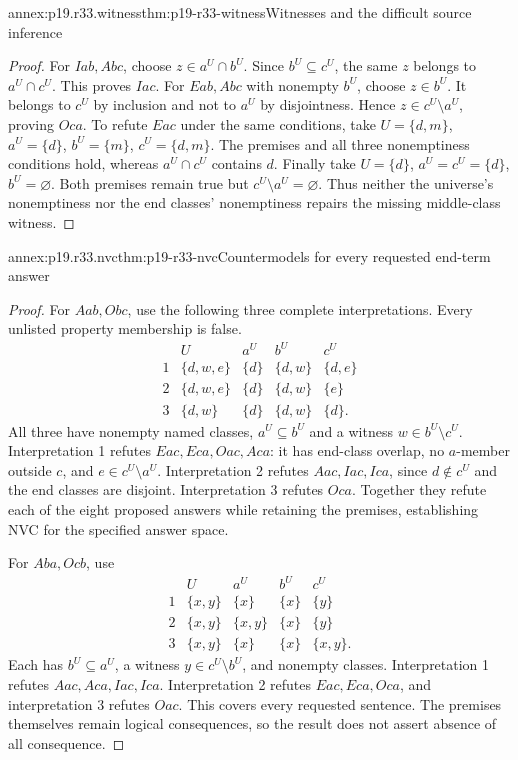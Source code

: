 \begin{annexitem}{annex:p19.r33.witness}{thm:p19-r33-witness}{Witnesses and the difficult source inference}
\begin{proof}
For \(Iab,Abc\), choose \(z\in a^U\cap b^U\).
Since \(b^U\subseteq c^U\), the same \(z\) belongs to
\(a^U\cap c^U\). This proves \(Iac\).
For \(Eab,Abc\) with nonempty \(b^U\), choose \(z\in b^U\).
It belongs to \(c^U\) by inclusion and not to \(a^U\) by
disjointness. Hence \(z\in c^U\setminus a^U\), proving \(Oca\).
To refute \(Eac\) under the same conditions, take
\(U=\{d,m\}\), \(a^U=\{d\}\), \(b^U=\{m\}\),
\(c^U=\{d,m\}\). The premises and all three nonemptiness
conditions hold, whereas \(a^U\cap c^U\) contains \(d\).
Finally take \(U=\{d\}\), \(a^U=c^U=\{d\}\),
\(b^U=\varnothing\). Both premises remain true but
\(c^U\setminus a^U=\varnothing\). Thus neither the universe's
nonemptiness nor the end classes' nonemptiness repairs the missing
middle-class witness.
\end{proof}
\end{annexitem}

\begin{annexitem}{annex:p19.r33.nvc}{thm:p19-r33-nvc}{Countermodels for every requested end-term answer}
\begin{proof}
For \(Aab,Obc\), use the following three complete interpretations.
Every unlisted property membership is false.
\[
\begin{array}{c|c|c|c|c}
&U&a^U&b^U&c^U\\
1&\{d,w,e\}&\{d\}&\{d,w\}&\{d,e\}\\
2&\{d,w,e\}&\{d\}&\{d,w\}&\{e\}\\
3&\{d,w\}&\{d\}&\{d,w\}&\{d\}.
\end{array}
\]
All three have nonempty named classes, \(a^U\subseteq b^U\)
and a witness \(w\in b^U\setminus c^U\).
Interpretation 1 refutes \(Eac,Eca,Oac,Aca\): it has end-class
overlap, no \(a\)-member outside \(c\), and \(e\in c^U\setminus a^U\).
Interpretation 2 refutes \(Aac,Iac,Ica\), since \(d\notin c^U\)
and the end classes are disjoint. Interpretation 3 refutes \(Oca\).
Together they refute each of the eight proposed answers while retaining
the premises, establishing NVC for the specified answer space.

For \(Aba,Ocb\), use
\[
\begin{array}{c|c|c|c|c}
&U&a^U&b^U&c^U\\
1&\{x,y\}&\{x\}&\{x\}&\{y\}\\
2&\{x,y\}&\{x,y\}&\{x\}&\{y\}\\
3&\{x,y\}&\{x\}&\{x\}&\{x,y\}.
\end{array}
\]
Each has \(b^U\subseteq a^U\), a witness
\(y\in c^U\setminus b^U\), and nonempty classes.
Interpretation 1 refutes \(Aac,Aca,Iac,Ica\).
Interpretation 2 refutes \(Eac,Eca,Oca\), and interpretation 3
refutes \(Oac\). This covers every requested sentence.
The premises themselves remain logical consequences, so the result
does not assert absence of all consequence.
\end{proof}
\end{annexitem}

